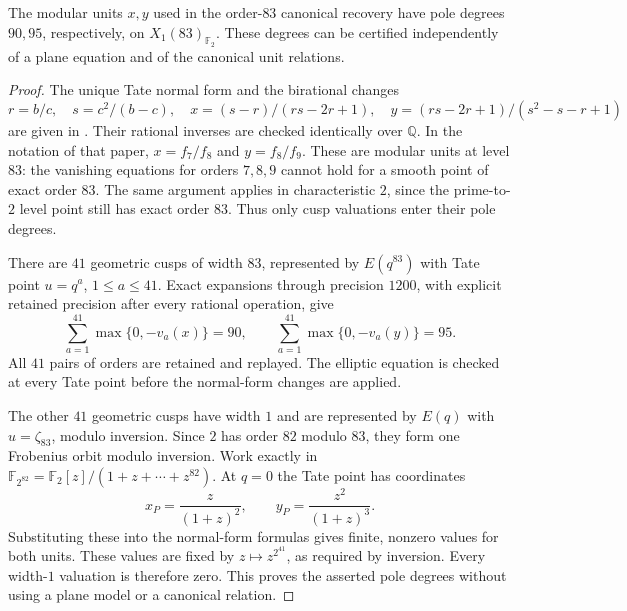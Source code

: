 \begin{lemma}\label{lem:nonic83-pole-degrees-direct}
The modular units $x,y$ used in the order-$83$ canonical recovery
have pole degrees $90,95$, respectively, on $X_1(83)_{\mathbb F_2}$.
These degrees can be certified independently of a plane equation
and of the canonical unit relations.
\end{lemma}
\begin{proof}
The unique Tate normal form and the birational changes
\[
 r=b/c,\quad s=c^2/(b-c),\quad
 x=(s-r)/(rs-2r+1),\quad y=(rs-2r+1)/(s^2-s-r+1)
\]
are given in \cite[Sections~2 and~2.1]{DvH}.
Their rational inverses are checked identically over $\mathbb Q$.
In the notation of that paper, $x=f_7/f_8$ and $y=f_8/f_9$.
These are modular units at level $83$: the vanishing equations for
orders $7,8,9$ cannot hold for a smooth point of exact order $83$.
The same argument applies in characteristic $2$, since the
prime-to-$2$ level point still has exact order $83$.
Thus only cusp valuations enter their pole degrees.

There are $41$ geometric cusps of width $83$, represented by
$E(q^{83})$ with Tate point $u=q^a$, $1\leq a\leq41$.
Exact expansions through precision $1200$, with explicit retained
precision after every rational operation, give
\[
 \sum_{a=1}^{41}\max\{0,-v_a(x)\}=90,\qquad
 \sum_{a=1}^{41}\max\{0,-v_a(y)\}=95.
\]
All $41$ pairs of orders are retained and replayed.
The elliptic equation is checked at every Tate point before the
normal-form changes are applied.

The other $41$ geometric cusps have width $1$ and are represented
by $E(q)$ with $u=\zeta_{83}$, modulo inversion.
Since $2$ has order $82$ modulo $83$, they form one Frobenius orbit
modulo inversion. Work exactly in
$\mathbb F_{2^{82}}=\mathbb F_2[z]/(1+z+\cdots+z^{82})$.
At $q=0$ the Tate point has coordinates
\[
 x_P=\frac{z}{(1+z)^2},\qquad
 y_P=\frac{z^2}{(1+z)^3}.
\]
Substituting these into the normal-form formulas gives finite,
nonzero values for both units. These values are fixed by
$z\mapsto z^{2^{41}}$, as required by inversion.
Every width-$1$ valuation is therefore zero.
This proves the asserted pole degrees without using a plane model
or a canonical relation.
\end{proof}
